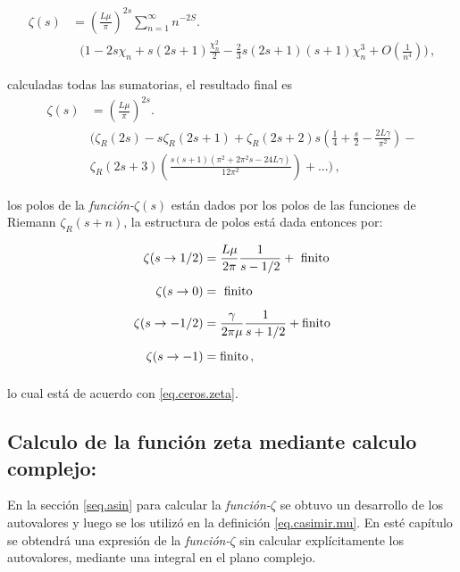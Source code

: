 \begin{align}
\zeta  (s) &= 
\left( \frac{L \mu }{\pi} \right) ^{2s}
\sum _{n=1} ^{\infty}
  n  ^{-2 S} . \\[5pt]
& \ \  \ \Bigg(
	1 - 
	2 s \chi _n +  s(2s+1) \frac{\chi _n ^2}{2} - 
	\frac{2}{3} s(2s+1)(s+1) \chi _n ^3  + O \left( \frac{1}{n ^4} \right) \Bigg)
	\, ,
	\nonumber
\end{align}

calculadas todas las sumatorias, el resultado final es
\begin{equation}
\begin{aligned}
    \zeta  (s) &= \left( \frac{L \mu }{\pi} \right) ^{2s} . \\[5pt]
	& \Bigg(
		\zeta _R ( 2 s ) -
		s \zeta _R ( 2s+1 ) +
		 \zeta _R (2s +2 ) s \left( \frac{1}{4} + \frac{s}{2} - \frac{2 L  \gamma}{\pi ^2} \right) - \\[5pt]
		 & \zeta _R (2s+3) \left(  
							\frac{s(s+1) ( \pi ^2 + 2 \pi ^2 s - 24 L \gamma)}{12 \pi ^2 }
		 					\right) 
		+ ...
		\Bigg)
		\, ,
\end{aligned}
\end{equation}


los polos de la {\it función-$\zeta (s)$} están dados por los polos de las funciones de Riemann $\zeta _R (s+n)$, la estructura de polos está dada entonces por:

\begin{equation}
\begin{aligned}
\zeta  (s \rightarrow 1/2) &= 
\frac{L \mu }{2 \pi } \frac{1}{s-1/2} + \ {\rm finito} \\[5pt]
\zeta  (s \rightarrow 0) &= \ {\rm finito} \\[5pt]
\zeta  (s \rightarrow -1/2) &= \frac{\gamma}{2 \pi \mu } \frac{1}{s+1/2} 
	+ {\rm finito}\\[5pt]
\zeta (s \rightarrow -1) &=  {\rm finito} 
\, ,
\\[5pt]
\end{aligned}
\label{eq.polos.asin}
\end{equation}

lo cual está de acuerdo con \ref{eq.ceros.zeta}.

\subsection{Calculo de la función zeta mediante calculo complejo:}
{\label{sec.complejo}}

En la sección \ref{seq.asin} para calcular la {\it función-$\zeta$} se obtuvo un desarrollo de los autovalores y luego se los utilizó en la definición \ref{eq.casimir.mu}. En esté capítulo se obtendrá una expresión de la {\it función-$\zeta$} sin calcular explícitamente los autovalores, mediante una integral en el plano complejo.


